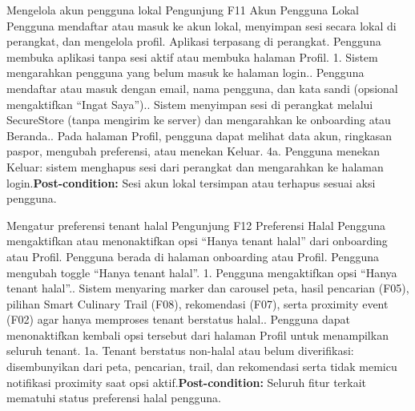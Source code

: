 {Mengelola akun pengguna lokal}
{Pengunjung}
{F11 Akun Pengguna Lokal}
{Pengguna mendaftar atau masuk ke akun lokal, menyimpan sesi secara lokal di perangkat, dan mengelola profil.}
{Aplikasi terpasang di perangkat.}
{Pengguna membuka aplikasi tanpa sesi aktif atau membuka halaman Profil.}
{1. Sistem mengarahkan pengguna yang belum masuk ke halaman login.. Pengguna mendaftar atau masuk dengan email, nama pengguna, dan kata sandi (opsional mengaktifkan ``Ingat Saya'').. Sistem menyimpan sesi di perangkat melalui SecureStore (tanpa mengirim ke server) dan mengarahkan ke onboarding atau Beranda.. Pada halaman Profil, pengguna dapat melihat data akun, ringkasan paspor, mengubah preferensi, atau menekan Keluar.}
{4a. Pengguna menekan Keluar: sistem menghapus sesi dari perangkat dan mengarahkan ke halaman login.\newline\textbf{Post-condition:} Sesi akun lokal tersimpan atau terhapus sesuai aksi pengguna.}

{Mengatur preferensi tenant halal}
{Pengunjung}
{F12 Preferensi Halal}
{Pengguna mengaktifkan atau menonaktifkan opsi ``Hanya tenant halal'' dari onboarding atau Profil.}
{Pengguna berada di halaman onboarding atau Profil.}
{Pengguna mengubah toggle ``Hanya tenant halal''.}
{1. Pengguna mengaktifkan opsi ``Hanya tenant halal''.. Sistem menyaring marker dan carousel peta, hasil pencarian (F05), pilihan Smart Culinary Trail (F08), rekomendasi (F07), serta proximity event (F02) agar hanya memproses tenant berstatus halal.. Pengguna dapat menonaktifkan kembali opsi tersebut dari halaman Profil untuk menampilkan seluruh tenant.}
{1a. Tenant berstatus non-halal atau belum diverifikasi: disembunyikan dari peta, pencarian, trail, dan rekomendasi serta tidak memicu notifikasi proximity saat opsi aktif.\newline\textbf{Post-condition:} Seluruh fitur terkait mematuhi status preferensi halal pengguna.}
